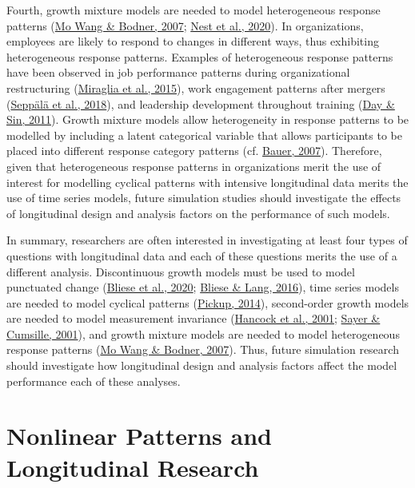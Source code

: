 \documentclass[
12pt, %
twoside,
english]{guelphthesis}
\begin{document}
Fourth, growth mixture models are needed to model heterogeneous response patterns (\protect\hyperlink{ref-wang2007}{Mo Wang \& Bodner, 2007}; \protect\hyperlink{ref-vandernest2020}{Nest et al., 2020}). In organizations, employees are likely to respond to changes in different ways, thus exhibiting heterogeneous response patterns. Examples of heterogeneous response patterns have been observed in job performance patterns during organizational restructuring (\protect\hyperlink{ref-miraglia2015}{Miraglia et al., 2015}), work engagement patterns after mergers (\protect\hyperlink{ref-seppuxe4luxe42018}{Seppälä et al., 2018}), and leadership development throughout training (\protect\hyperlink{ref-day2011}{Day \& Sin, 2011}). Growth mixture models allow heterogeneity in response patterns to be modelled by including a latent categorical variable that allows participants to be placed into different response category patterns (cf. \protect\hyperlink{ref-bauer2007}{Bauer, 2007}). Therefore, given that heterogeneous response patterns in organizations merit the use of interest for modelling cyclical patterns with intensive longitudinal data merits the use of time series models, future simulation studies should investigate the effects of longitudinal design and analysis factors on the performance of such models.

In summary, researchers are often interested in investigating at least four types of questions with longitudinal data and each of these questions merits the use of a different analysis. Discontinuous growth models must be used to model punctuated change (\protect\hyperlink{ref-bliese2020}{Bliese et al., 2020}; \protect\hyperlink{ref-bliese2016}{Bliese \& Lang, 2016}), time series models are needed to model cyclical patterns (\protect\hyperlink{ref-pickup2014}{Pickup, 2014}), second-order growth models are needed to model measurement invariance (\protect\hyperlink{ref-hancock2001}{Hancock et al., 2001}; \protect\hyperlink{ref-sayer2001}{Sayer \& Cumsille, 2001}), and growth mixture models are needed to model heterogeneous response patterns (\protect\hyperlink{ref-wang2007}{Mo Wang \& Bodner, 2007}). Thus, future simulation research should investigate how longitudinal design and analysis factors affect the model performance each of these analyses.

\hypertarget{nonlinear-patterns-and-longitudinal-research}{%
\section{Nonlinear Patterns and Longitudinal Research}\label{nonlinear-patterns-and-longitudinal-research}}
\end{document}
